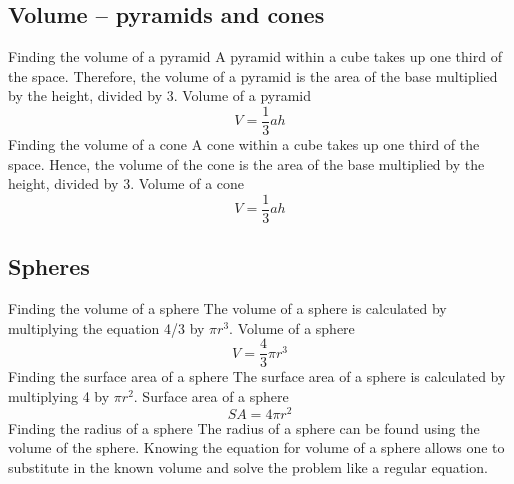 \begin{outline}
\0
\subsection{Volume -- pyramids and cones}
	\1 Finding the volume of a pyramid
		\2 A pyramid within a cube takes up one third of the space. Therefore, the volume of a pyramid is the area of the base multiplied by the height, divided by 3.
			\3 Volume of a pyramid
				\[V = \frac{1}{3}ah\]
	\1 Finding the volume of a cone
		\2 A cone within a cube takes up one third of the space. Hence, the volume of the cone is the area of the base multiplied by the height, divided by 3.
			\3 Volume of a cone
				\[V = \frac{1}{3}ah\]

\0
\subsection{Spheres}
	\1 Finding the volume of a sphere
		\2 The volume of a sphere is calculated by multiplying the equation 4/3 by $\pi r^3$.
			\3 Volume of a sphere
				\[V = \frac{4}{3}\pi r^3\]
	\1 Finding the surface area of a sphere
		\2 The surface area of a sphere is calculated by multiplying 4 by $\pi r^2$.
			\3 Surface area of a sphere
				\[SA = 4\pi r^2\]
	\1 Finding the radius of a sphere
		\2 The radius of a sphere can be found using the volume of the sphere. Knowing the equation for volume of a sphere allows one to substitute in the known volume and solve the problem like a regular equation.

\end{outline}
